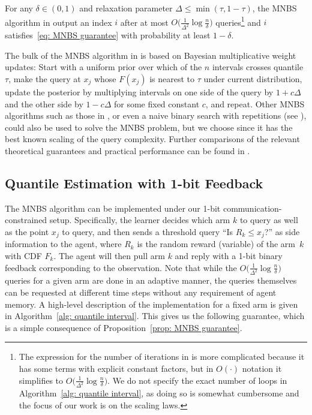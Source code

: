 \begin{proposition}
\label{prop: MNBS guarantee}
For any $\delta \in (0, 1)$ and relaxation parameter $\Delta \le \min(\tau, 1-\tau)$, the MNBS algorithm in \cite{gretta2023sharp}
output an index $i$ after at most
$O \big( \frac{1}{\Delta^2}  \log  \frac{n}{\delta} \big)$
queries\footnote{\label{footnote: constants MNBS}The expression for the number of iterations in \cite{gretta2023sharp} is more complicated because it has some terms with explicit constant factors, but in $O(\cdot)$ notation it simplifies to $O \big( \frac{1}{\Delta^2}  \log  \frac{n}{\delta} \big)$. We do not specify the exact number of loops in Algorithm~\ref{alg: quantile interval}, as doing so is somewhat cumbersome and the focus of our work is on the scaling laws.} and $i$ satisfies~\eqref{eq: MNBS guarantee} with probability at least $1- \delta$. 
\end{proposition}
The bulk of the MNBS algorithm in \cite{gretta2023sharp} is based on Bayesian multiplicative weight updates: Start with a uniform prior over which of the $n$ intervals crosses quantile $\tau$, make the query at $x_j$ whose $F(x_j)$ is nearest to $\tau$ under current distribution, update the posterior by multiplying intervals on one side of the query by $1 + c \Delta$ and the other side by $1 - c \Delta$ for some fixed constant $c$, and repeat. Other MNBS algorithms such as those in \cite{karp2007noisy}, or even a naive binary search with repetitions (see \cite[\S 1.2]{karp2007noisy}), could also be used to solve the MNBS problem, but we choose  \cite{gretta2023sharp} since it has the best known scaling of the query complexity. Further comparisons of the relevant theoretical guarantees and practical performance can be found in \cite{gretta2023sharp}.


\subsection{Quantile Estimation with 1-bit Feedback}
\label{sec: appendix quant est related work}
The MNBS algorithm can be implemented under our 1-bit communication-constrained setup. Specifically, the learner decides which arm $k$ to query as well as the point $x_j$  to query, and then sends a threshold
query ``Is $R_k \le x_j$?'' as side information to the agent, where $R_k$ is the random reward (variable) of the arm~$k$ with CDF $F_k$. The agent will then pull arm $k$ and reply with a 1-bit binary feedback corresponding to the observation. Note that 
while the $O \big( \frac{1}{\Delta^2}  \log  \frac{n}{\delta} \big)$ queries for a given arm are done in an adaptive manner, the queries themselves can be requested at different time steps without any requirement of agent memory. 
A high-level description of the implementation for a fixed arm is given in Algorithm~\ref{alg: quantile interval}. This gives us the following guarantee, which is a simple consequence of Proposition~\ref{prop: MNBS guarantee}.




